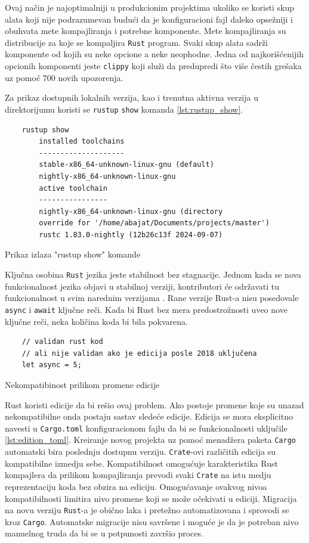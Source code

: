 \documentclass[11pt]{article}
\begin{document}
Ovaj način je najoptimalniji u produkcionim projektima ukoliko se koristi skup alata koji 
nije podrazumevan budući da je konfiguracioni fajl daleko opsežniji i obuhvata mete kompajliranja i 
potrebne komponente. Mete kompajliranja su distribucije za koje se kompaljira \verb|Rust| program.
Svaki skup alata sadrži komponente od kojih su neke opcione a neke neophodne. Jedna od najkorišćenijih 
opcionih komponenti jeste \verb|clippy| koji služi da predupredi što više čestih grešaka uz pomoć 
700 novih upozorenja. 


Za prikaz dostupnih lokalnih verzija, kao i trenutna aktivna verzija u direktorijumu koristi se \verb|rustup|
\verb|show| komanda \ref{lst:rustup_show}.

\begin{listing}[H]
\begin{verbatim}
    rustup show
        installed toolchains
        --------------------
        stable-x86_64-unknown-linux-gnu (default)
        nightly-x86_64-unknown-linux-gnu
        active toolchain
        ----------------
        nightly-x86_64-unknown-linux-gnu (directory 
        override for '/home/abajat/Documents/projects/master')
        rustc 1.83.0-nightly (12b26c13f 2024-09-07)
\end{verbatim}
\caption{Prikaz izlaza "rustup show" komande}
\label{lst:rustup_show}
\end{listing}

Ključna osobina \verb|Rust| jezika jeste stabilnost bez stagnacije. Jednom kada se nova 
funkcionalnost jezika objavi u stabilnoj verziji, kontributori će održavati 
tu funkcionalnost u svim narednim verzijama \cite{editions}.
Rane verzije Rust-a nisu posedovale \verb|async| i \verb|await| ključne reči.
Kada bi Rust bez mera predostrožnosti uveo nove ključne reči, neka količina koda bi bila pokvarena.

\begin{listing}[h]
\begin{verbatim}
    // validan rust kod 
    // ali nije validan ako je edicija posle 2018 uključena
    let async = 5; 
\end{verbatim}
\caption{Nekompatibinost prilikom promene edicije}
\label{lst:edition}
\end{listing}


Rust koristi edicije da bi rešio ovaj problem. Ako postoje promene koje su unazad 
nekompatibilne onda postaju sastav sledeće edicije. Edicija se mora eksplicitno navesti 
u \verb|Cargo.toml| konfiguracionom fajlu da bi se funkcionalnosti uključile \ref{lst:edition_toml}. Kreiranje novog projekta uz 
pomoć menadžera paketa \verb|Cargo| automatski bira poslednju dostupnu verziju.
\verb|Crate|-ovi različitih edicija su kompatibilne izmedju sebe. Kompatibilnost omogućuje 
karakteristika Rust kompajlera da prilikom kompajliranja prevodi svaki \verb|Crate| na istu medju reprezentaciju 
koda bez obzira na ediciju. Omogućavanje ovakvog nivoa kompatibilnosti limitira nivo promene 
koji se može očekivati u ediciji. Migracija na novu verziju \verb|Rust|-a je obično laka i pretežno automatizovana
i sprovodi se kroz \verb|Cargo|. Automatske migracije nisu savršene i moguće je da je potreban nivo manuelnog 
truda da bi se u potpunosti završio proces.
\end{document}
